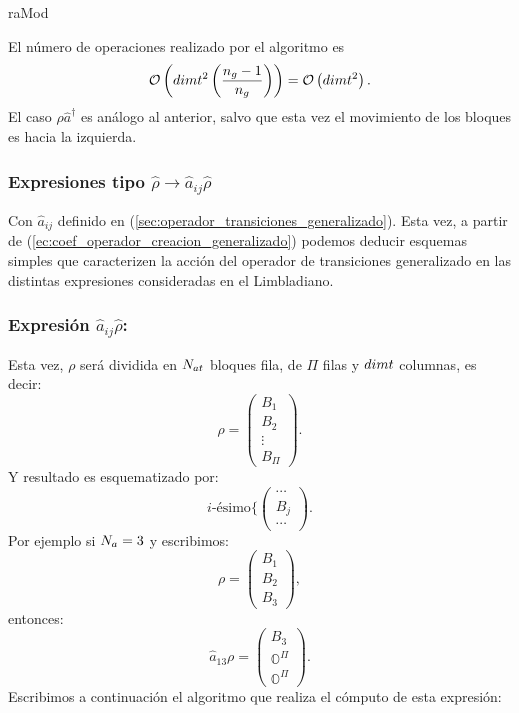 \begin{algorithm}[H]
\caption{raMod}\label{algo:raMod}
\LinesNumbered
{}
\end{algorithm}
\quad El n\'umero de operaciones realizado por el algoritmo es $$\mathcal{O}\left(dimt^2\left(\frac{n_g-1}{n_g}\right)\right)=\mathcal{O}\left(dimt^2\right).$$ El caso ${\rho}\hat{a}^{\dag}$ es an\'alogo al anterior, salvo que esta vez el movimiento de los bloques es hacia la izquierda. 
\subsubsection{Expresiones tipo $\hat{\rho}\rightarrow \hat{a}_{ij}\hat{\rho}$}\label{sec:aijrho} \quad Con $\hat{a}_{ij}$ definido en (\ref{sec:operador_transiciones_generalizado}). Esta vez, a partir de (\ref{ec:coef_operador_creacion_generalizado}) podemos deducir esquemas simples que caracterizen la acci\'on del operador de transiciones generalizado en las distintas expresiones consideradas en el Limbladiano.
\subsubsection*{Expresi\'on $\hat{a}_{ij}\hat{\rho}$: }\quad  Esta vez, $\rho$ ser\'a dividida en $N_{at}$ bloques fila, de $\Pi$ filas y $dimt$ columnas, es decir:\begin{equation}
 \rho=\left(\begin{array}{c}              
B_1\\
B_2\\
\vdots\\
B_{\Pi}
\end{array}\right).\label{ec:esquema_aijrho}
\end{equation}
Y resultado es esquematizado por:
$$\mbox{$i$-\'esimo}\{\left(
\begin{array}{c}
 \cdots\\
B_j\\
\cdots
\end{array}
\right).
$$
Por ejemplo si $N_a=3$ y escribimos:
$$\rho=\left(\begin{array}{ccc}              
B_1\\
B_2\\
B_3
\end{array}\right),
$$
entonces:
$$\hat{a}_{13}\rho=\left(\begin{array}{ccc}              
B_{3}\\
\mathbb{O}^\Pi\\
\mathbb{O}^\Pi
             \end{array}\right).
$$
\quad Escribimos a continuaci\'on el algoritmo que realiza el c\'omputo de esta expresi\'on:

